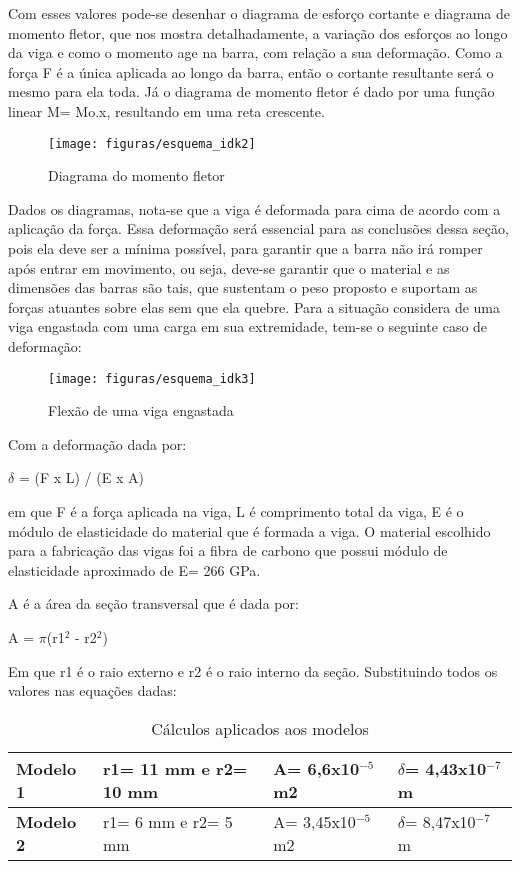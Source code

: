 Com esses valores pode-se desenhar o diagrama de esforço cortante e diagrama de momento fletor, que nos mostra detalhadamente, a variação dos esforços ao longo da viga e como o momento age na barra, com relação a sua deformação. Como a força F é a única aplicada ao longo da barra, então o cortante resultante será o mesmo para ela toda. Já o diagrama de momento fletor é dado por uma função linear M= Mo.x, resultando em uma reta crescente.

\begin{figure}[H]
\centering\texttt{[image: figuras/esquema\_idk2]}
\caption{Diagrama do momento fletor}
\end{figure}

Dados os diagramas, nota-se que a viga é deformada para cima de acordo com a aplicação da força. Essa deformação será essencial para as conclusões dessa seção, pois ela deve ser a mínima possível, para garantir que a barra não irá romper após entrar em movimento, ou seja, deve-se garantir que o material e as dimensões das barras são tais, que sustentam o peso proposto e suportam as forças atuantes sobre elas sem que ela quebre.  Para a situação considera de uma viga engastada com uma carga em sua extremidade, tem-se o seguinte caso de deformação:

\begin{figure}[H]
\centering\texttt{[image: figuras/esquema\_idk3]}
\caption{Flexão de uma viga engastada}
\end{figure}

Com a deformação dada por:

\begin{center}
$\delta$ = (F x L) / (E x A)
\end{center}

em que F é a força aplicada na viga, L é comprimento total da viga, E é o módulo de elasticidade do material que é formada a viga. O material escolhido para a fabricação das vigas foi a fibra de carbono que possui módulo de elasticidade aproximado de E= 266 GPa. \cite{reforco2011}

A é a área da seção transversal que é dada por:

\begin{center}
A = $\pi$(r1$^{2}$ - r2$^{2}$)
\end{center}

 Em que r1 é o raio externo e r2 é o raio interno da seção. Substituindo todos os valores nas equações dadas:

\begin{table}[H]
\centering
\begin{tabular}{|l|l|l|l|}
\hline
\textbf{Modelo 1} & r1= 11 mm e r2= 10 mm & A= 6,6x10$^{-5}$ m2 & $\delta$= 4,43x10$^{-7}$ m \\ \hline
\textbf{Modelo 2} & r1= 6 mm e r2= 5 mm & A= 3,45x10$^{-5}$ m2 & $\delta$= 8,47x10$^{-7}$ m \\ \hline
\end{tabular}
\caption{Cálculos aplicados aos modelos}
\end{table}

